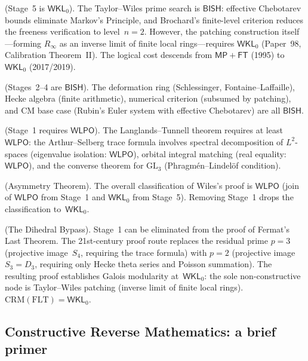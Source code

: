 \documentclass[11pt]{article}
\theoremstyle{plain}
\theoremstyle{definition}
\theoremstyle{remark}
\newcommand{\GL}{\mathrm{GL}}
\newcommand{\CRM}{\mathrm{CRM}}
\newcommand{\BISH}{\mathsf{BISH}}
\newcommand{\WLPO}{\mathsf{WLPO}}
\newcommand{\MP}{\mathsf{MP}}
\newcommand{\FT}{\mathsf{FT}}
\newcommand{\WKL}{\mathsf{WKL}_0}
\begin{document}
\begin{description}[leftmargin=2em]
\item[Theorem A] (Stage~5 is $\WKL$).
The Taylor--Wiles prime search is $\BISH$: effective Chebotarev
bounds \cite{LMO1979, AhnKwon2019} eliminate Markov's Principle,
and Brochard's finite-level criterion \cite{Brochard2017} reduces
the freeness verification to level~$n = 2$.  However, the
patching construction itself---forming $R_\infty$ as an
inverse limit of finite local rings---requires $\WKL$
(Paper~98, Calibration Theorem~II).  The logical cost descends
from $\MP + \FT$ (1995) to $\WKL$ (2017/2019).

\item[Theorem B] (Stages~2--4 are $\BISH$).
The deformation ring (Schlessinger, Fontaine--Laffaille),
Hecke algebra (finite arithmetic), numerical criterion (subsumed
by patching), and CM base case (Rubin's Euler system with
effective Chebotarev) are all $\BISH$.

\item[Theorem C] (Stage~1 requires $\WLPO$).
The Langlands--Tunnell theorem requires
at least~$\WLPO$: the Arthur--Selberg trace formula involves
spectral decomposition of $L^2$-spaces (eigenvalue isolation:
$\WLPO$), orbital integral matching (real equality: $\WLPO$),
and the converse theorem for $\GL_3$ (Phragm\'en--Lindel\"of
condition).

\item[Theorem D] (Asymmetry Theorem).
The overall classification of Wiles's proof is $\WLPO$
(join of $\WLPO$ from Stage~1 and $\WKL$ from Stage~5).
Removing Stage~1 drops the classification to~$\WKL$.

\item[Theorem E] (The Dihedral Bypass).
Stage~1 can be eliminated from the proof of Fermat's Last Theorem.
The 21st-century proof route replaces the residual prime $p = 3$
(projective image~$S_4$, requiring the trace formula) with $p = 2$
(projective image~$S_3 = D_3$, requiring only Hecke theta series
and Poisson summation).  The resulting proof establishes Galois
modularity at~$\WKL$: the sole non-constructive node is
Taylor--Wiles patching (inverse limit of finite local rings).
$\CRM(\mathrm{FLT}) = \WKL$.
\end{description}

\subsection{Constructive Reverse Mathematics: a brief primer}
\end{document}
